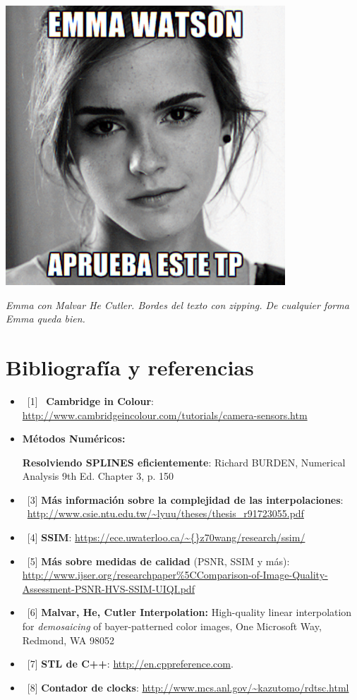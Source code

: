 	\begin{center}
		\includegraphics[scale=0.5]{img/filtered_apruebaestetp.png}
		\vspace{2pt}
		\par
		\footnotesize\textit{Emma con Malvar He Cutler. Bordes del texto con zipping. De cualquier forma Emma queda bien.}
	\end{center}


\section{Bibliografía y referencias} 

\begin{itemize}
\item \ [1] \ \textbf{Cambridge in Colour}:  \url{http://www.cambridgeincolour.com/tutorials/camera-sensors.htm}
\item \textbf{Métodos Numéricos:}
		\par [2] \textbf{Resolviendo SPLINES eficientemente}: Richard BURDEN, Numerical Analysis 9th Ed. Chapter 3, p. 150
\item \ [3] \textbf{Más información sobre la complejidad de las interpolaciones}: \ \url{http://www.csie.ntu.edu.tw/~lyuu/theses/thesis\_r91723055.pdf}
\item \ [4] \textbf{SSIM}:  \url{https://ece.uwaterloo.ca/\~{}z70wang/research/ssim/}
\item \ [5] \textbf{Más sobre medidas de calidad} (PSNR, SSIM y más): \url{http://www.ijser.org/researchpaper\%5CComparison-of-Image-Quality-Assessment-PSNR-HVS-SSIM-UIQI.pdf}
\item \ [6] \textbf{Malvar, He, Cutler Interpolation:} High-quality linear interpolation for \textit{demosaicing} of bayer-patterned color images, One Microsoft Way, Redmond, WA 98052
\item \ [7] \textbf{STL de C++}: \url{http://en.cppreference.com}.
\item \ [8] \textbf{Contador de clocks}: \url{http://www.mcs.anl.gov/\~kazutomo/rdtsc.html}

\end{itemize}




